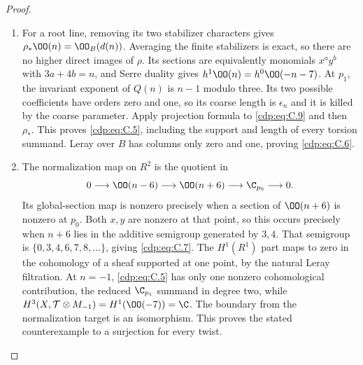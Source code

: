\begin{proof}
\begin{enumerate}[label={$\langle1\rangle$\arabic*.},leftmargin=*]
\item For a root line, removing its two stabilizer characters gives
$\rho_*\OO(n)=\OO_B(d(n))$. Averaging the finite stabilizers is exact, so there are no higher direct images of $\rho$. Its sections are equivalently monomials $x^ay^b$ with $3a+4b=n$, and Serre duality gives $h^1\OO(n)=h^0\OO(-n-7)$. At $p_1$, the invariant exponent of $Q(n)$ is $n-1$ modulo three. Its two possible coefficients have orders zero and one, so its coarse length is $\epsilon_n$ and it is killed by the coarse parameter. Apply projection formula to \eqref{cdp:eq:C.9} and then $\rho_*$. This proves \eqref{cdp:eq:C.5}, including the support and length of every torsion summand. Leray over $B$ has columns only zero and one, proving \eqref{cdp:eq:C.6}.

\item The normalization map on $R^2$ is the quotient in
\[
0\longrightarrow\OO(n-6)\longrightarrow\OO(n+6)
 \longrightarrow\C_{p_0}\longrightarrow0.
\]
Its global-section map is nonzero precisely when a section of $\OO(n+6)$ is nonzero at $p_0$. Both $x,y$ are nonzero at that point, so this occurs precisely when $n+6$ lies in the additive semigroup generated by $3,4$. That semigroup is $\{0,3,4,6,7,8,\ldots\}$, giving \eqref{cdp:eq:C.7}. The $H^1(R^1)$ part maps to zero in the cohomology of a sheaf supported at one point, by the natural Leray filtration. At $n=-1$, \eqref{cdp:eq:C.5} has only one nonzero cohomological contribution, the reduced $\C_{p_1}$ summand in degree two, while $H^3(X,\mathcal T\otimes M_{-1})=H^1(\OO(-7))=\C$. The boundary from the normalization target is an isomorphism. This proves the stated counterexample to a surjection for every twist.

\end{enumerate}
\end{proof}
